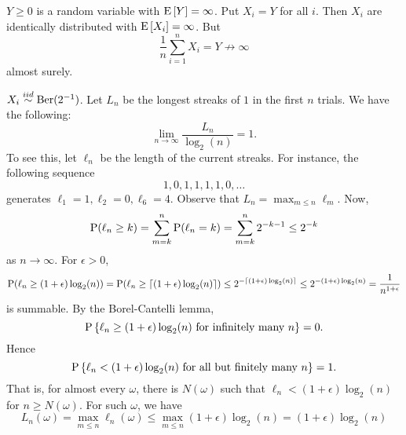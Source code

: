\begin{example}
    $Y\geq 0$ is a random variable with $\E\sbrc{Y} = \infty$. Put $X_i = Y$ 
    for all $i$. Then $X_i$ are identically distributed with $\E\sbrc{X_i} = \infty$. 
    But 
    \begin{equation*}
        \frac{1}{n}\sum_{i=1}^n X_i = Y\not\to \infty 
    \end{equation*}
    almost surely. 
\end{example}

\begin{example}
    $X_i\iidsim\Ber(2^{-1})$. Let $L_n$ be the longest streaks of $1$ in the first $n$ 
    trials. We have the following: 
    \begin{equation*}
        \lim_{n\to\infty}\frac{L_n}{\log_2(n)} = 1. 
    \end{equation*}
    To see this, let $\ell_n$ be the length of the current streaks. For 
    instance, the following sequence 
    \begin{equation*}
        1,0,1,1,1,1,0,\ldots 
    \end{equation*}
    generates $\ell_1 = 1, \ell_2 = 0, \ell_6 = 4$. Observe that $L_n = \max_{m\leq n}\ell_m$. 
    Now, 
    \begin{equation*}
        \P(\ell_n\geq k) = \sum_{m=k}^n \P(\ell_n = k) = \sum_{m=k}^n 2^{-k-1} 
        \leq 2^{-k}
    \end{equation*}
    as $n\to\infty$. For $\epsilon>0$, 
    \begin{equation*}
        \P(\ell_n \geq (1+\epsilon)\log_2(n)) = \P(\ell_n \geq \ceil{(1+\epsilon)\log_2(n)}) 
        \leq 2^{-\ceil{(1+\epsilon)\log_2(n)}} \leq 2^{-(1+\epsilon)\log_2(n)}
        = \frac{1}{n^{1+\epsilon}}
    \end{equation*}
    is summable. By the Borel-Cantelli lemma, 
    \begin{equation*}
        \P\set{\ell_n \geq (1+\epsilon)\log_2(n)\text{ for infinitely many $n$}} = 0. 
    \end{equation*}
    Hence 
    \begin{equation*}
        \P\set{\ell_n < (1+\epsilon)\log_2(n)\text{ for all but finitely many $n$}} = 1. 
    \end{equation*}
    That is, for almost every $\omega$, there is $N(\omega)$ such that 
    $\ell_n < (1+\epsilon)\log_2(n)$ for $n\geq N(\omega)$. For such $\omega$, 
    we have 
    \begin{equation*}
        L_n(\omega) = \max_{m\leq n}\ell_n(\omega) \leq\max_{m\leq n}(1+\epsilon)\log_2(n) = (1+\epsilon)\log_2(n)

\end{equation*}
\end{example}
